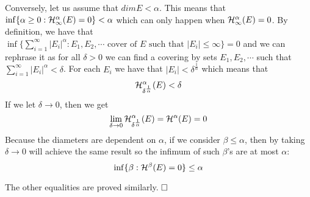 \documentclass{article}
\begin{document}
Conversely, let us assume that $dim E<\alpha$. This means that $\inf\{\alpha\geq 0:\mathcal{H}_{\infty}^{\alpha}(E)=0\}<\alpha$ which can only happen when $\mathcal{H}_{\infty}^{\alpha}(E)=0$. By definition, we have that $\inf\{\sum_{i=1}^{\infty}|E_i|^{\alpha}:E_1,E_2,\cdots \text{ cover of } E \text{ such that } |E_i|\leq \infty\}=0$ and we can rephrase it as for all $\delta>0$ we can find a covering by sets $E_1,E_2,\cdots$ such that $\sum_{i=1}^{\infty}|E_i|^{\alpha}<\delta$. For each $E_i$ we have that $|E_i|<\delta^{\frac{1}{\alpha}}$ which means that $$\mathcal{H}_{\delta^{\frac{1}{\alpha}}}^{\alpha}(E)<\delta$$
If we let $\delta\rightarrow 0$, then we get 
$$\lim_{\delta\rightarrow 0}\mathcal{H}_{\delta^{\frac{1}{\alpha}}}^{\alpha}(E)=\mathcal{H}^{\alpha}(E)=0$$
Because the diameters are dependent on $\alpha$, if we consider $\beta\leq \alpha$, then by taking $\delta\rightarrow 0$ will achieve the same result so the infimum of such $\beta$'s are at most $\alpha$:
$$\inf\{\beta: \mathcal{H}^{\beta}(E)=0\}\leq\alpha $$

The other equalities are proved similarly.
$\qed$\\
\end{document}

